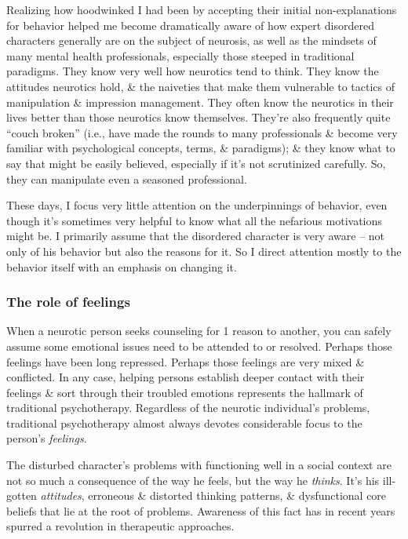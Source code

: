 \documentclass{article}
\numberwithin{equation}{section}
\begin{document}
Realizing how hoodwinked I had been by accepting their initial non-explanations for behavior helped me become dramatically aware of how expert disordered characters generally are on the subject of neurosis, as well as the mindsets of many mental health professionals, especially those steeped in traditional paradigms. They know very well how neurotics tend to think. They know the attitudes neurotics hold, \& the naiveties that make them vulnerable to tactics of manipulation \& impression management. They often know the neurotics in their lives better than those neurotics know themselves. They're also frequently quite ``couch broken'' (i.e., have made the rounds to many professionals \& become very familiar with psychological concepts, terms, \& paradigms); \& they know what to say that might be easily believed, especially if it's not scrutinized carefully. So, they can manipulate even a seasoned professional.

These days, I focus very little attention on the underpinnings of behavior, even though it's sometimes very helpful to know what all the nefarious motivations might be. I primarily assume that the disordered character is very aware -- not only of his behavior but also the reasons for it. So I direct attention mostly to the behavior itself with an emphasis on changing it.

\subsubsection{The role of feelings}
When a neurotic person seeks counseling for 1 reason to another, you can safely assume some emotional issues need to be attended to or resolved. Perhaps those feelings have been long repressed. Perhaps those feelings are very mixed \& conflicted. In any case, helping persons establish deeper contact with their feelings \& sort through their troubled emotions represents the hallmark of traditional psychotherapy. Regardless of the neurotic individual's problems, traditional psychotherapy almost always devotes considerable focus to the person's \textit{feelings}.
	
The disturbed character's problems with functioning well in a social context are not so much a consequence of the way he feels, but the way he \textit{thinks}. It's his ill-gotten \textit{attitudes}, erroneous \& distorted thinking patterns, \& dysfunctional core beliefs that lie at the root of problems. Awareness of this fact has in recent years spurred a revolution in therapeutic approaches.
\end{document}

